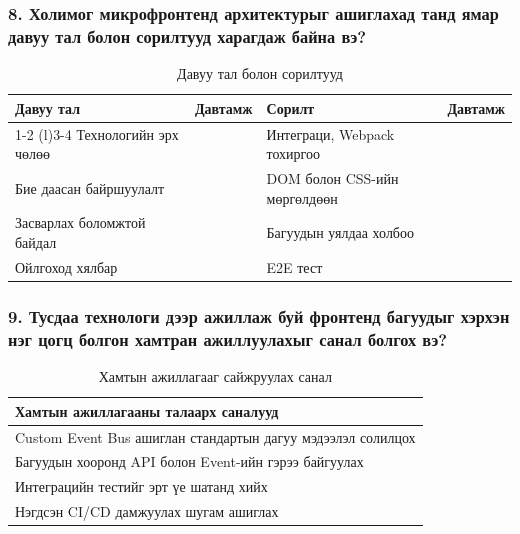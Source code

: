 \subsubsection{8. Холимог микрофронтенд архитектурыг ашиглахад танд ямар давуу тал болон сорилтууд харагдаж байна вэ?}
\begin{table}[h!]
\centering
\renewcommand{\arraystretch}{0.7}
\begin{tabular}{p{6cm} c p{6cm} c}
\toprule
\textbf{Давуу тал} & \textbf{Давтамж} & \textbf{Сорилт} & \textbf{Давтамж} \\ 
\cmidrule(r){1-2} \cmidrule(l){3-4} %
Технологийн эрх чөлөө & & Интеграци, Webpack тохиргоо & \\ 
Бие даасан байршуулалт & & DOM болон CSS-ийн мөргөлдөөн & \\ 
Засварлах боломжтой байдал & & Багуудын уялдаа холбоо & \\ 
Ойлгоход хялбар & & E2E тест & \\ 
\bottomrule
\end{tabular}
\caption{Давуу тал болон сорилтууд}
\label{tab:pros_cons}
\end{table}

\subsubsection{9. Тусдаа технологи дээр ажиллаж буй фронтенд багуудыг хэрхэн нэг цогц болгон хамтран ажиллуулахыг санал болгох вэ?}

\begin{table}[h!]
\centering
\renewcommand{\arraystretch}{0.7}
\begin{tabular}{l}
\toprule
\textbf{Хамтын ажиллагааны талаарх саналууд} \\ 
\midrule
Custom Event Bus ашиглан стандартын дагуу мэдээлэл солилцох \\ 
Багуудын хооронд API болон Event-ийн гэрээ байгуулах \\ 
Интеграцийн тестийг эрт үе шатанд хийх \\ 
Нэгдсэн CI/CD дамжуулах шугам ашиглах \\ 
\bottomrule
\end{tabular}
\caption{Хамтын ажиллагааг сайжруулах санал}
\label{tab:collaboration_suggestions}
\end{table}


